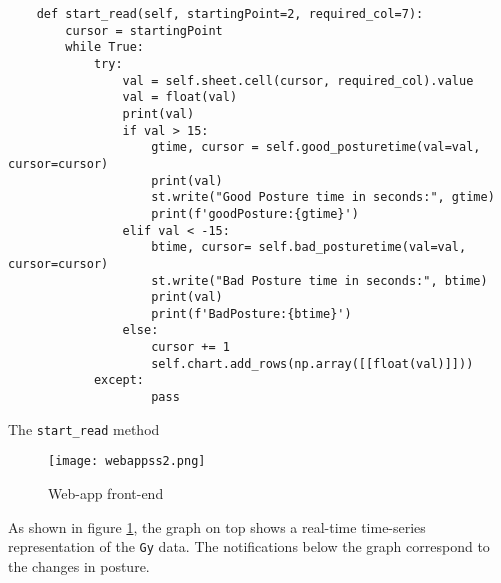 \documentclass[./RTPostureTrackingReport.tex]{subfiles}
\begin{document}
\begin{code}
    \begin{verbatim}
    def start_read(self, startingPoint=2, required_col=7):
        cursor = startingPoint
        while True:
            try:
                val = self.sheet.cell(cursor, required_col).value
                val = float(val)
                print(val)
                if val > 15:
                    gtime, cursor = self.good_posturetime(val=val, cursor=cursor)
                    print(val)
                    st.write("Good Posture time in seconds:", gtime)
                    print(f'goodPosture:{gtime}')
                elif val < -15:
                    btime, cursor= self.bad_posturetime(val=val, cursor=cursor)
                    st.write("Bad Posture time in seconds:", btime)
                    print(val)
                    print(f'BadPosture:{btime}')
                else:
                    cursor += 1
                    self.chart.add_rows(np.array([[float(val)]]))
            except:
                    pass
    \end{verbatim}
    \caption{The \texttt{start_read} method}
    \label{code:start_read}
\end{code}

\begin{figure}[H]
    \centering
    \texttt{[image: webappss2.png]}
    \caption{Web-app front-end}
    \label{fig:webapp}
\end{figure}

As shown in figure \ref{fig:webapp}, the graph on top shows a real-time
time-series representation of the \texttt{Gy} data. The notifications below the
graph correspond to the changes in posture.
\end{document}
